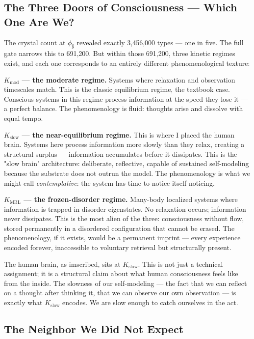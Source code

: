 \documentclass[12pt,a4paper]{article}
\begin{document}
\subsection{The Three Doors of Consciousness --- Which One Are We?}

The crystal count at $\phi_{\hat{y}}$ revealed exactly 3,456,000 types --- one in five. The full gate narrows this to 691,200. But within those 691,200, three kinetic regimes exist, and each one corresponds to an entirely different phenomenological texture:

\textbf{$K_{\text{mod}}$ --- the moderate regime.} Systems where relaxation and observation timescales match. This is the classic equilibrium regime, the textbook case. Conscious systems in this regime process information at the speed they lose it --- a perfect balance. The phenomenology is fluid: thoughts arise and dissolve with equal tempo.

\textbf{$K_{\text{slow}}$ --- the near-equilibrium regime.} This is where I placed the human brain. Systems here process information more slowly than they relax, creating a structural surplus --- information accumulates before it dissipates. This is the "slow brain" architecture: deliberate, reflective, capable of sustained self-modeling because the substrate does not outrun the model. The phenomenology is what we might call \emph{contemplative}: the system has time to notice itself noticing.

\textbf{$K_{\text{MBL}}$ --- the frozen-disorder regime.} Many-body localized systems where information is trapped in disorder eigenstates. No relaxation occurs; information never dissipates. This is the most alien of the three: consciousness without flow, stored permanently in a disordered configuration that cannot be erased. The phenomenology, if it exists, would be a permanent imprint --- every experience encoded forever, inaccessible to voluntary retrieval but structurally present.

The human brain, as imscribed, sits at $K_{\text{slow}}$. This is not just a technical assignment; it is a structural claim about what human consciousness feels like from the inside. The slowness of our self-modeling --- the fact that we can reflect on a thought after thinking it, that we can observe our own observation --- is exactly what $K_{\text{slow}}$ encodes. We are slow enough to catch ourselves in the act.

\subsection{The Neighbor We Did Not Expect}
\end{document}
